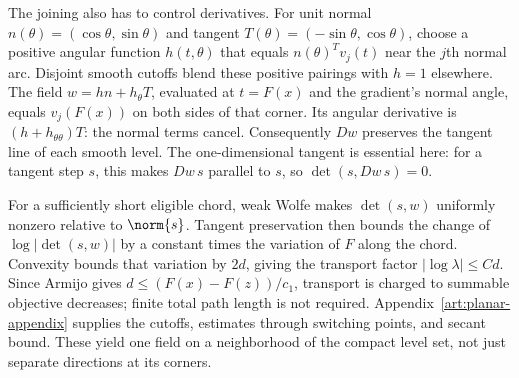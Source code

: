 The joining also has to control derivatives. For unit normal
$n(\theta)=(\cos\theta,\sin\theta)$ and tangent
$T(\theta)=(-\sin\theta,\cos\theta)$, choose a positive angular function
$h(t,\theta)$ that equals $n(\theta)^Tv_j(t)$ near the $j$th normal arc.
Disjoint smooth cutoffs blend these positive pairings with $h=1$ elsewhere.
The field $w=hn+h_\theta T$, evaluated at $t=F(x)$ and the gradient's
normal angle, equals $v_j(F(x))$ on both sides of that corner.
Its angular derivative is $(h+h_{\theta\theta})T$: the normal terms
cancel. Consequently $Dw$ preserves the tangent line of each smooth
level. The one-dimensional tangent is essential here: for a tangent step
$s$, this makes $Dw\,s$ parallel to $s$, so $\det(s,Dw\,s)=0$.

For a sufficiently short eligible chord, weak Wolfe makes
$\det(s,w)$ uniformly nonzero relative to $\norm{s}$. Tangent preservation
then bounds the change of $\log|\det(s,w)|$ by a constant times the
variation of $F$ along the chord. Convexity bounds that variation by
$2d$, giving the transport factor $|\log\lambda|\le C d$.
Since Armijo gives $d\le(F(x)-F(z))/c_1$, transport is charged to summable
objective decreases; finite total path length is not required.
Appendix~\ref{art:planar-appendix} supplies the cutoffs, estimates through
switching points, and secant bound. These yield one field on a neighborhood
of the compact level set, not just separate directions at its corners.

